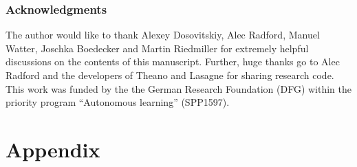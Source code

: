 \documentclass{article} \usepackage{iclr2016_conference,times}
\begin{document}
\subsubsection*{Acknowledgments}
The author would like to thank Alexey Dosovitskiy, Alec Radford, Manuel Watter, Joschka Boedecker and Martin Riedmiller for extremely helpful discussions on the contents of this manuscript. Further, huge thanks go to Alec Radford and the developers of Theano \citep{Theano_scipy,Theano_2012} and Lasagne \citep{Lasagne_2015} for sharing research code. This work was funded by the the German Research Foundation (DFG) within the priority program ``Autonomous learning'' (SPP1597).




\section*{Appendix}
\end{document}
